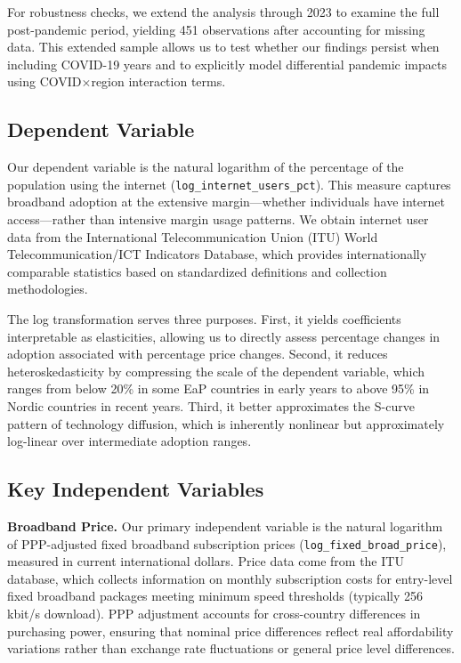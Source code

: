 \documentclass[12pt,review]{elsarticle}
\begin{document}
For robustness checks, we extend the analysis through 2023 to examine the full post-pandemic period, yielding 451 observations after accounting for missing data. This extended sample allows us to test whether our findings persist when including COVID-19 years and to explicitly model differential pandemic impacts using COVID$\times$region interaction terms.

\subsection{Dependent Variable}

Our dependent variable is the natural logarithm of the percentage of the population using the internet (\texttt{log\_internet\_users\_pct}). This measure captures broadband adoption at the extensive margin—whether individuals have internet access—rather than intensive margin usage patterns. We obtain internet user data from the International Telecommunication Union (ITU) World Telecommunication/ICT Indicators Database, which provides internationally comparable statistics based on standardized definitions and collection methodologies.

The log transformation serves three purposes. First, it yields coefficients interpretable as elasticities, allowing us to directly assess percentage changes in adoption associated with percentage price changes. Second, it reduces heteroskedasticity by compressing the scale of the dependent variable, which ranges from below 20\% in some EaP countries in early years to above 95\% in Nordic countries in recent years. Third, it better approximates the S-curve pattern of technology diffusion, which is inherently nonlinear but approximately log-linear over intermediate adoption ranges.

\subsection{Key Independent Variables}

\textbf{Broadband Price.} Our primary independent variable is the natural logarithm of PPP-adjusted fixed broadband subscription prices (\texttt{log\_fixed\_broad\_price}), measured in current international dollars. Price data come from the ITU database, which collects information on monthly subscription costs for entry-level fixed broadband packages meeting minimum speed thresholds (typically 256 kbit/s download). PPP adjustment accounts for cross-country differences in purchasing power, ensuring that nominal price differences reflect real affordability variations rather than exchange rate fluctuations or general price level differences.
\end{document}

